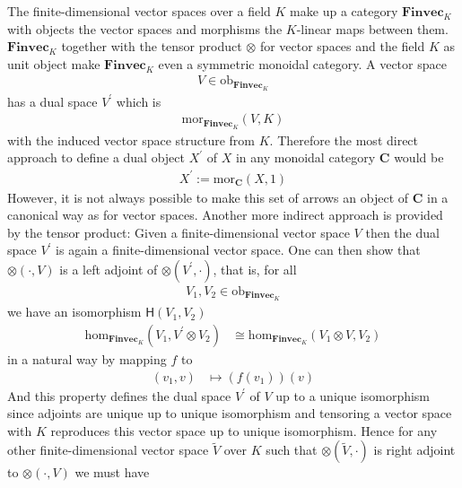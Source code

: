 \begin{exa}
\label{exa:finvecmoncat}
The finite-dimensional vector spaces over a field $K$ make up a category $\mathbf{Finvec}_{K}$ with objects the vector spaces and morphisms the $K$-linear maps between them. $\mathbf{Finvec}_{K}$ together with the tensor product $\otimes$ for vector spaces and the field $K$ as unit object make $\mathbf{Finvec}_{K}$ even a symmetric monoidal category. A vector space
\begin{align*}
  V
  \in
  \mathrm{ob}_{\mathbf{Finvec}_{K}}
\end{align*}
has a dual space $V^{\prime}$ which is
\begin{align*}
  \mathrm{mor}_{\mathbf{Finvec}_{K}}(V,K)
\end{align*}
with the induced vector space structure from $K$. Therefore the most direct approach to define a dual object $X^{\prime}$ of $X$ in any monoidal category $\mathbf{C}$ would be
\begin{align*}
  X^{\prime}
  :=
  \mathrm{mor}_{\mathbf{C}}(X,1)
\end{align*}
However, it is not always possible to make this set of arrows an object of $\mathbf{C}$ in a canonical way as for vector spaces. Another more indirect approach is provided by the tensor product: Given a finite-dimensional vector space $V$ then the dual space $V^{\prime}$ is again a finite-dimensional vector space. One can then show that $\otimes(\cdot,V)$ is a left adjoint of $\otimes(V^{\prime},\cdot)$, that is, for all
\begin{align*}
  V_{1},
  V_{2}
  \in
  \mathrm{ob}_{\mathbf{Finvec}_{K}}
\end{align*}
we have an isomorphism $\mathsf{H}(V_{1},V_{2})$
\begin{align*}
  \mathrm{hom}_{\mathbf{Finvec}_{K}}
  \left(
    V_{1},
    V^{\prime}
    \otimes
    V_{2}
  \right)
  &\cong
  \mathrm{hom}_{\mathbf{Finvec}_{K}}
  \left(
    V_{1}
    \otimes
    V,
    V_{2}
  \right)
\end{align*}
in a natural way by mapping $f$ to
\begin{align*}
  (v_{1},v)
  &\mapsto
  \left(
    f(v_{1})
  \right)
  (v)
\end{align*}
And this property defines the dual space $V^{\prime}$ of $V$ up to a unique isomorphism since adjoints are unique up to unique isomorphism and tensoring a vector space with $K$ reproduces this vector space up to unique isomorphism. Hence for any other finite-dimensional vector space $\tilde{V}$ over $K$ such that $\otimes(\tilde{V},\cdot)$ is right adjoint to $\otimes(\cdot,V)$ we must have

\end{exa}

